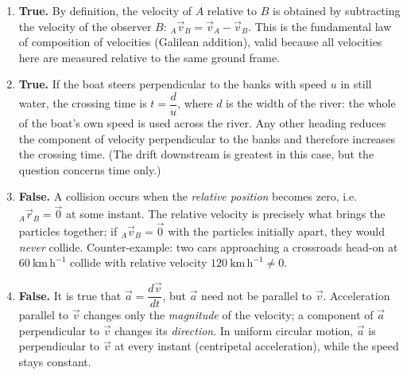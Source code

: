 \documentclass[11pt]{article}
\begin{document}
\begin{corrige}
\begin{enumerate}
\item \textbf{True.} By definition, the velocity of $A$ relative to $B$ is obtained by subtracting the velocity of the observer $B$: ${}_A\vec{v}_B = \vec{v}_A - \vec{v}_B$. This is the fundamental law of composition of velocities (Galilean addition), valid because all velocities here are measured relative to the same ground frame.
\item \textbf{True.} If the boat steers perpendicular to the banks with speed $u$ in still water, the crossing time is $t = \dfrac{d}{u}$, where $d$ is the width of the river: the whole of the boat's own speed is used across the river. Any other heading reduces the component of velocity perpendicular to the banks and therefore increases the crossing time. (The drift downstream is greatest in this case, but the question concerns time only.)
\item \textbf{False.} A collision occurs when the \emph{relative position} becomes zero, i.e.\ ${}_A\vec{r}_B = \vec{0}$ at some instant. The relative velocity is precisely what brings the particles together; if ${}_A\vec{v}_B = \vec{0}$ with the particles initially apart, they would \emph{never} collide. Counter-example: two cars approaching a crossroads head-on at $60\ \mathrm{km\,h^{-1}}$ collide with relative velocity $120\ \mathrm{km\,h^{-1}} \neq 0$.
\item \textbf{False.} It is true that $\vec{a} = \dfrac{d\vec{v}}{dt}$, but $\vec{a}$ need not be parallel to $\vec{v}$. Acceleration parallel to $\vec{v}$ changes only the \emph{magnitude} of the velocity; a component of $\vec{a}$ perpendicular to $\vec{v}$ changes its \emph{direction}. In uniform circular motion, $\vec{a}$ is perpendicular to $\vec{v}$ at every instant (centripetal acceleration), while the speed stays constant.
\end{enumerate}
\end{corrige}
\end{document}
